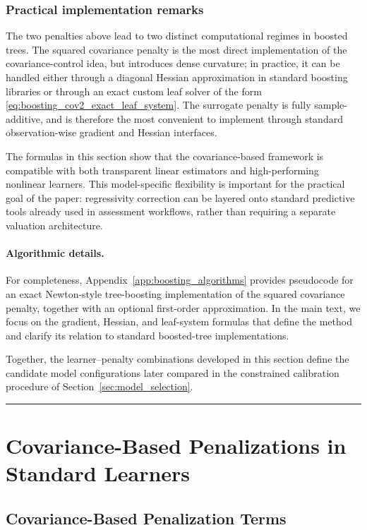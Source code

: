\documentclass[12pt, draft]{article}
\theoremstyle{plain}
\theoremstyle{definition}
\newcommand{\1}{\mathbf{1}}
\begin{document}
{\subsubsection{Practical implementation remarks}

The two penalties above lead to two distinct computational regimes in boosted trees. The squared covariance penalty is the most direct implementation of the covariance-control idea, but introduces dense curvature; in practice, it can be handled either through a diagonal Hessian approximation in standard boosting libraries or through an exact custom leaf solver of the form \eqref{eq:boosting_cov2_exact_leaf_system}. The surrogate penalty is fully sample-additive, and is therefore the most convenient to implement through standard observation-wise gradient and Hessian interfaces.

The formulas in this section show that the covariance-based framework is compatible with both transparent linear estimators and high-performing nonlinear learners. This model-specific flexibility is important for the practical goal of the paper: regressivity correction can be layered onto standard predictive tools already used in assessment workflows, rather than requiring a separate valuation architecture.

\paragraph{Algorithmic details.}
For completeness, Appendix~\ref{app:boosting_algorithms} provides pseudocode for an exact Newton-style tree-boosting implementation of the squared covariance penalty, together with an optional first-order approximation. In the main text, we focus on the gradient, Hessian, and leaf-system formulas that define the method and clarify its relation to standard boosted-tree implementations.

Together, the learner--penalty combinations developed in this section define the candidate model configurations later compared in the constrained calibration procedure of Section~\ref{sec:model_selection}.

\hrule

\section{Covariance-Based Penalizations in Standard Learners}
\label{sec:covariance_penalty_learning_in_learners}

\subsection{Covariance-Based Penalization Terms}
\label{sec:covariance_penalty_learning}

}
\end{document}
